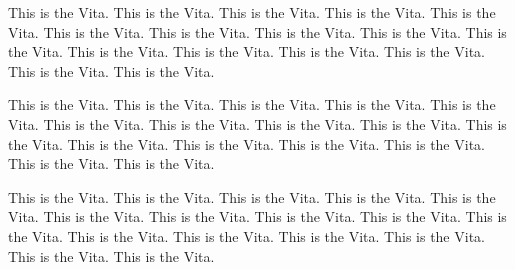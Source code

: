 \documentclass[12pt]{template/nuthesis}
\begin{document}
\begin{vita}                    %

This is the Vita. This is the Vita. This is the Vita. This is the Vita. 
This is the Vita. This is the Vita. This is the Vita. This is the Vita. 
This is the Vita. This is the Vita. This is the Vita. This is the Vita. 
This is the Vita. This is the Vita. This is the Vita. This is the Vita. 

This is the Vita. This is the Vita. This is the Vita. This is the Vita. 
This is the Vita. This is the Vita. This is the Vita. This is the Vita. 
This is the Vita. This is the Vita. This is the Vita. This is the Vita. 
This is the Vita. This is the Vita. This is the Vita. This is the Vita. 

This is the Vita. This is the Vita. This is the Vita. This is the Vita. 
This is the Vita. This is the Vita. This is the Vita. This is the Vita. 
This is the Vita. This is the Vita. This is the Vita. This is the Vita. 
This is the Vita. This is the Vita. This is the Vita. This is the Vita. 


\end{vita}
\end{document}

